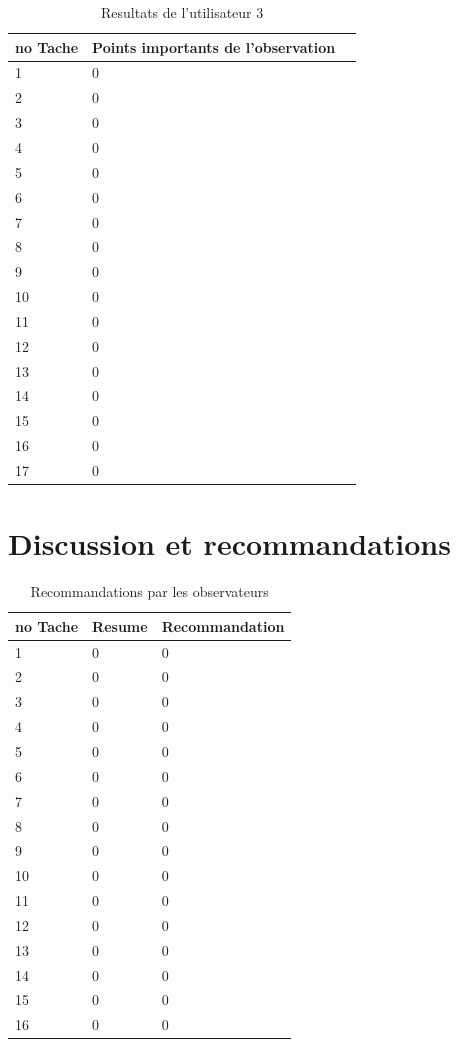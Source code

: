 \documentclass[letterpaper, oneside, 12pt, these, creativecommons]{thETS}
\begin{document}
\newpage

\begin{table}
	\centering
	\begin{tabular}{|l|l|l|}
	\hline
	no Tache	& Points importants de l'observation	\\ \hline
	1		& 0						\\ \hline
	2		& 0						\\ \hline
	3		& 0						\\ \hline
	4		& 0						\\ \hline
	5		& 0						\\ \hline
	6		& 0						\\ \hline
	7		& 0						\\ \hline
	8		& 0						\\ \hline
	9		& 0						\\ \hline
	10		& 0						\\ \hline
	11		& 0						\\ \hline
	12		& 0						\\ \hline
	13		& 0						\\ \hline
	14		& 0						\\ \hline
	15		& 0						\\ \hline
	16		& 0						\\ \hline
	17		& 0						\\ \hline
	\end{tabular}
	\caption{Resultats de l'utilisateur 3}
\end{table}

\newpage

\section{Discussion et recommandations}

\begin{table}
	\centering
	\begin{tabular}{|l|l|l|}
	\hline
	no Tache	& Resume	& Recommandation 	\\ \hline
	1		& 0		& 0 			\\ \hline
	2		& 0		& 0 			\\ \hline
	3		& 0		& 0 			\\ \hline
	4		& 0		& 0 			\\ \hline
	5		& 0		& 0 			\\ \hline
	6		& 0		& 0 			\\ \hline
	7		& 0		& 0 			\\ \hline
	8		& 0		& 0 			\\ \hline
	9		& 0		& 0 			\\ \hline
	10		& 0		& 0 			\\ \hline
	11		& 0		& 0 			\\ \hline
	12		& 0		& 0 			\\ \hline
	13		& 0		& 0 			\\ \hline
	14		& 0		& 0 			\\ \hline
	15		& 0		& 0 			\\ \hline
	16		& 0		& 0 			\\ \hline
	\end{tabular}
	\caption{Recommandations par les observateurs}
\end{table}
\end{document}
